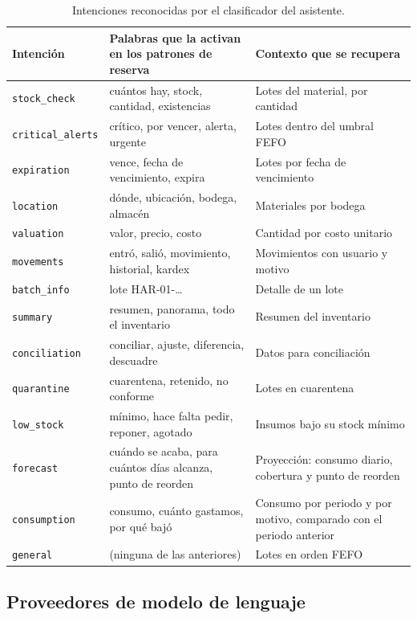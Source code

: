 \begin{table}[!htbp]
\centering
\caption{Intenciones reconocidas por el clasificador del asistente.}
\label{tab:dis_intenciones}
\begin{tabular}{|l|p{5.3cm}|p{5.5cm}|}
\hline
\textbf{Intención} & \textbf{Palabras que la activan en los patrones de reserva} & \textbf{Contexto que se recupera} \\
\hline
\texttt{stock\_check} & cuántos hay, stock, cantidad, existencias & Lotes del material, por cantidad \\ \hline
\texttt{critical\_alerts} & crítico, por vencer, alerta, urgente & Lotes dentro del umbral FEFO \\ \hline
\texttt{expiration} & vence, fecha de vencimiento, expira & Lotes por fecha de vencimiento \\ \hline
\texttt{location} & dónde, ubicación, bodega, almacén & Materiales por bodega \\ \hline
\texttt{valuation} & valor, precio, costo & Cantidad por costo unitario \\ \hline
\texttt{movements} & entró, salió, movimiento, historial, kardex & Movimientos con usuario y motivo \\ \hline
\texttt{batch\_info} & lote HAR-01-\ldots & Detalle de un lote \\ \hline
\texttt{summary} & resumen, panorama, todo el inventario & Resumen del inventario \\ \hline
\texttt{conciliation} & conciliar, ajuste, diferencia, descuadre & Datos para conciliación \\ \hline
\texttt{quarantine} & cuarentena, retenido, no conforme & Lotes en cuarentena \\ \hline
\texttt{low\_stock} & mínimo, hace falta pedir, reponer, agotado & Insumos bajo su stock mínimo \\ \hline
\texttt{forecast} & cuándo se acaba, para cuántos días alcanza, punto de reorden & Proyección: consumo diario, cobertura y punto de reorden \\ \hline
\texttt{consumption} & consumo, cuánto gastamos, por qué bajó & Consumo por periodo y por motivo, comparado con el periodo anterior \\ \hline
\texttt{general} & (ninguna de las anteriores) & Lotes en orden FEFO \\ \hline
\end{tabular}
\end{table}

\subsection{Proveedores de modelo de lenguaje}

